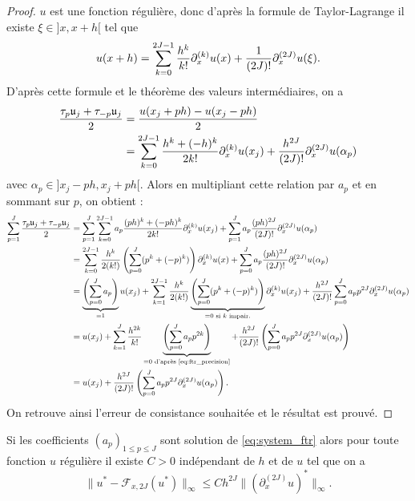 \begin{proof}
$u$ est une fonction régulière, donc d'après la formule de Taylor-Lagrange il existe $\xi \in ]x,x+h[$ tel que
\begin{equation}
u(x+h) = \displaystyle\sum\limits_{k=0}^{2J-1} \dfrac{h^k}{k!} \partial_x^{(k)} u(x) +\dfrac{1}{(2J)!} \partial_x^{(2J)}u(\xi).
\end{equation}
D'après cette formule et le théorème des valeurs intermédiaires, on a
\begin{align*}
\dfrac{\tau_p \mathfrak{u}_j + \tau_{-p} \mathfrak{u}_j}{2} & = \dfrac{u(x_j + ph) - u(x_j-ph)}{2} \\
& = \displaystyle\sum\limits_{k=0}^{2J-1} \dfrac{h^k + (-h)^k}{2k!} \partial_x^{(k)}u(x_j) + \dfrac{h^{2J}}{(2J)!} \partial_x^{(2J)} u(\alpha_p)
\end{align*}
avec $\alpha_p \in ]x_j - ph, x_j + ph[$. Alors en multipliant cette relation par $a_p$ et en sommant sur $p$, on obtient :
\begin{align*}
\displaystyle\sum\limits_{p=1}^J \dfrac{\tau_p \mathfrak{u}_j + \tau_{-p} \mathfrak{u}_j}{2} & = \displaystyle\sum\limits_{p=1}^J \displaystyle\sum\limits_{k=0}^{2J-1} a_p \dfrac{(ph)^k + (-ph)^k}{2k!} \partial_x^{(k)}u(x_j) + \displaystyle\sum\limits_{p=1}^J a_p \dfrac{(ph)^{2J}}{(2J)!} \partial_x^{(2J)}u(\alpha_p) \\
& = \displaystyle\sum\limits_{k=0}^{2J-1} \dfrac{h^k}{2 (k!)} \left( \displaystyle\sum\limits_{p=0}^J (p^k + (-p)^k) \right) \partial_x^{(k)} u(x) + \displaystyle\sum\limits_{p=0}^J a_p \dfrac{(ph)^{2J}}{(2J)!} \partial_x^{(2J)}u(\alpha_p) \\
& = \underbrace{ \left( \displaystyle\sum\limits_{p=0}^J a_p \right)}_{=1}u(x_j) + 
\displaystyle\sum\limits_{k=1}^{2J-1} \dfrac{h^k}{2(k!)} \underbrace{\left( \displaystyle\sum\limits_{p=0}^J (p^k + (-p)^k)  \right)}_{=0 \text{ si } k \text{ impair.}} \partial_x^{(k)}u(x_j) + \dfrac{h^{2J}}{(2J)!} \displaystyle\sum\limits_{p=0}^Ja_p p^{2J} \partial_x^{(2J)}u(\alpha_p)  \\
& = u(x_j) + \displaystyle\sum\limits_{k=1}^J \dfrac{h^{2k}}{k!} \underbrace{\left( \displaystyle\sum\limits_{p=0}^J a_p p^{2k} \right)}_{ = 0 \text{ d'après \eqref{eq:ftr_precision}}}
+ \dfrac{h^{2J}}{(2J)!} \left( \displaystyle\sum\limits_{p=0}^J a_p p^{2J} \partial_x^{(2J)}u(\alpha_p) \right) \\
& = u(x_j) + \dfrac{h^{2J}}{(2J)!} \left( \displaystyle\sum\limits_{p=0}^J a_p p^{2J} \partial_x^{(2J)}u(\alpha_p) \right).
\end{align*}
On retrouve ainsi l'erreur de consistance souhaitée et le résultat est prouvé.
\end{proof}

\begin{corollaire}
Si les coefficients $(a_p)_{1 \leq p \leq J}$ sont solution de \eqref{eq:system_ftr} alors pour toute fonction $u$ régulière il existe $C>0$ indépendant de $h$ et de $u$ tel que  on a 
\begin{equation}
\| u^* -  \mathcal{F}_{x,2J}(u^*) \|_{\infty} \leq C h^{2J} \| (\partial_x^{(2J)}u)^* \|_{\infty}.
\end{equation}
\end{corollaire}

